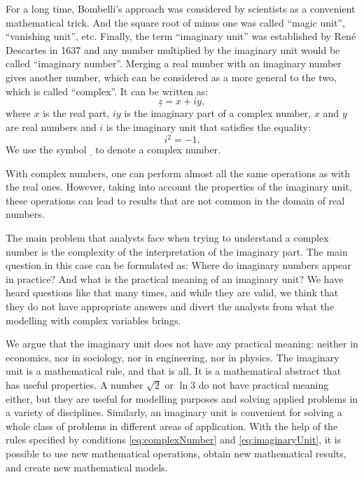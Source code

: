 \documentclass[
]{book}
\begin{document}
For a long time, Bombelli's approach was considered by scientists as a convenient mathematical trick. And the square root of minus one was called ``magic unit'', ``vanishing unit'', etc. Finally, the term ``imaginary unit'' was established by René Descartes in 1637 and any number multiplied by the imaginary unit would be called ``imaginary number''. Merging a real number with an imaginary number gives another number, which can be considered as a more general to the two, which is called ``complex''. It can be written as:
\begin{equation}
    \underline{z} = x+iy ,
    \label{eq:complexNumber}
\end{equation}
where \(x\) is the real part, \(iy\) is the imaginary part of a complex number, \(x\) and \(y\) are real numbers and \(i\) is the imaginary unit that satisfies the equality:
\begin{equation}
    i^2 = -1 .
    \label{eq:imaginaryUnit}
\end{equation}
We use the symbol \(\underline{}\) to denote a complex number.

With complex numbers, one can perform almost all the same operations as with the real ones. However, taking into account the properties of the imaginary unit, these operations can lead to results that are not common in the domain of real numbers.

The main problem that analysts face when trying to understand a complex number is the complexity of the interpretation of the imaginary part. The main question in this case can be formulated as: Where do imaginary numbers appear in practice? And what is the practical meaning of an imaginary unit? We have heard questions like that many times, and while they are valid, we think that they do not have appropriate answers and divert the analysts from what the modelling with complex variables brings.

We argue that the imaginary unit does not have any practical meaning: neither in economics, nor in sociology, nor in engineering, nor in physics. The imaginary unit is a mathematical rule, and that is all. It is a mathematical abstract that has useful properties. A number \(\sqrt{2}\) or \(\ln 3\) do not have practical meaning either, but they are useful for modelling purposes and solving applied problems in a variety of disciplines. Similarly, an imaginary unit is convenient for solving a whole class of problems in different areas of application. With the help of the rules specified by conditions \eqref{eq:complexNumber} and \eqref{eq:imaginaryUnit}, it is possible to use new mathematical operations, obtain new mathematical results, and create new mathematical models.
\end{document}
